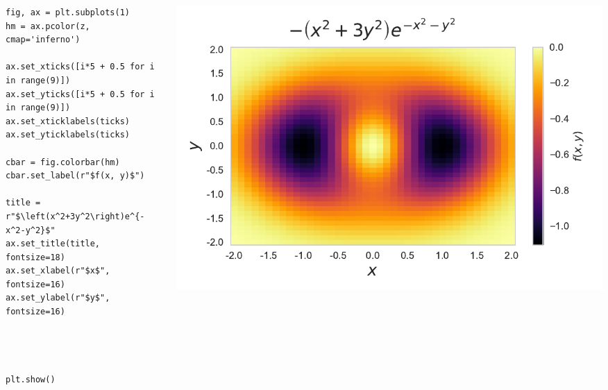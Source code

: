 \documentclass{beamer}
\begin{document}
\begin{frame}[fragile]
\tiny{
\begin{columns}
\begin{column}{0.45\textwidth}
\begin{verbatim}
fig, ax = plt.subplots(1)
hm = ax.pcolor(z, cmap='inferno')

ax.set_xticks([i*5 + 0.5 for i in range(9)])
ax.set_yticks([i*5 + 0.5 for i in range(9)])
ax.set_xticklabels(ticks)
ax.set_yticklabels(ticks)

cbar = fig.colorbar(hm)
cbar.set_label(r"$f(x, y)$")

title = r"$\left(x^2+3y^2\right)e^{-x^2-y^2}$"
ax.set_title(title, fontsize=18)
ax.set_xlabel(r"$x$", fontsize=16)
ax.set_ylabel(r"$y$", fontsize=16)




plt.show()
\end{verbatim}
\end{column}
\begin{column}{0.55\textwidth}
\includegraphics[width=\textwidth]{heatmap_6.pdf}
\end{column}
\end{columns}
}
\end{frame}
\end{document}
